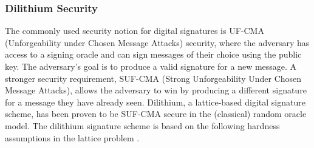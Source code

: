 \documentclass[5p,times]{elsarticle}
\theoremstyle{definition}
\theoremstyle{remark}
\numberwithin{equation}{section}
\begin{document}
\subsubsection{Dilithium Security}
The commonly used security notion for digital signatures is UF-CMA (Unforgeability under Chosen Message Attacks) security, where the adversary has access to a signing oracle and can sign messages of their choice using the public key. 
The adversary's goal is to produce a valid signature for a new message. 
A stronger security requirement, SUF-CMA (Strong Unforgeability Under Chosen Message Attacks), allows the adversary to win by producing a different signature for a message they have already seen. 
Dilithium, a lattice-based digital signature scheme, has been proven to be SUF-CMA secure in the (classical) random oracle model.
The dilithium signature scheme is based on the following hardness assumptions in the lattice problem \cite{ducasCRYSTALSDilithiumLatticeBasedDigital2018}.
\end{document}
